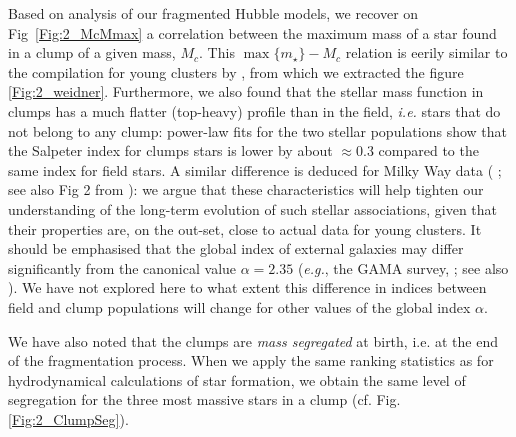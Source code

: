  Based on analysis of our fragmented Hubble models, we recover on Fig~\ref{Fig:2_McMmax} a correlation between the maximum mass of a star found in a clump of a given mass, $M_c$. This $\max\{m_\star\} - M_c $ relation is eerily similar to the compilation for young clusters by \citet{Weidner2013}, from which we extracted the figure \ref{Fig:2_weidner}. Furthermore, we also found that the stellar mass function in clumps has a much flatter (top-heavy) profile than in the field, {\it i.e.} stars that do not belong to any clump: power-law fits for the two stellar populations show that the Salpeter index for clumps stars is lower by about $\approx 0.3$ compared to the same index for field stars. A similar difference is deduced for Milky Way data ( \citealt{Czekaj2014,Rybizki2015}; see also Fig 2 from \citealt{Bastian2010}):  we argue that these characteristics will help tighten our understanding of the long-term evolution of such stellar associations, given that their properties are, on the out-set, close to actual data for young clusters. It should be emphasised that the global index of external galaxies may differ significantly from the canonical value $\alpha = 2.35$ ({\it e.g.}, the GAMA survey, \citealt{Gunawardhana2011}; see also \citealt{Hoversten2008}). We have not explored here to what extent this difference in indices  between field and clump populations will change for other values of the global index $\alpha$.

We have also noted that the clumps are {\it mass segregated} at birth, i.e. at the end of the fragmentation process. When we apply the same ranking statistics as for hydrodynamical calculations of star formation, we obtain the same level of segregation for the three most massive stars in a clump (cf. Fig. \ref{Fig:2_ClumpSeg}). %

